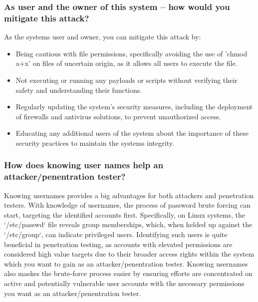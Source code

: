\subsubsection{As user and the owner of this system -- how would you mitigate this attack?}
As the systems user and owner, you can mitigate this attack by:

\begin{itemize}
    \item Being cautious with file permissions, specifically avoiding the use of 'chmod a+x' on files of uncertain origin, as it allows all users to execute the file.
    \item Not executing or running any payloads or scripts without verifying their safety and understanding their functions.
    \item Regularly updating the system's security measures, including the deployment of firewalls and antivirus solutions, to prevent unauthorized access.
    \item Educating any additional users of the system about the importance of these security practices to maintain the systems integrity.
\end{itemize}




\subsubsection{How does knowing user names help an attacker/penentration tester?}
Knowing usernames provides a big advantages for both attackers and penetration testers.
With knowledge of usernames, the process of password brute forcing can start, targeting the identified accounts first.
Specifically, on Linux systems, the `/etc/passwd` file reveals group memberships, which, when helded up against the `/etc/group`, can indicate privileged users.
Identifying such users is quite beneficial in penetration testing, as accounts with elevated permissions are considered
high value targets due to their broader access rights within the system which you want to gain as an attacker/penentration tester.
Knowing usernames also maskes the brute-force process easier by ensuring efforts are
concentrated on active and potentially vulnerable user accounts with the necessary permissions you want as an attacker/penentration tester.


